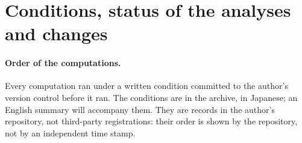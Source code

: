 \renewcommand{\thesection}{S\arabic{section}}
\setcounter{section}{0}

\section{Conditions, status of the analyses and changes}
\label{app:status}

\paragraph{Order of the computations.} Every computation ran under a written condition committed to the author's version
control before it ran. The conditions are in the archive, in Japanese; an English summary will accompany them. They are records in
the author's repository, not third-party registrations: their order is shown by the repository, not by an independent
time stamp.

